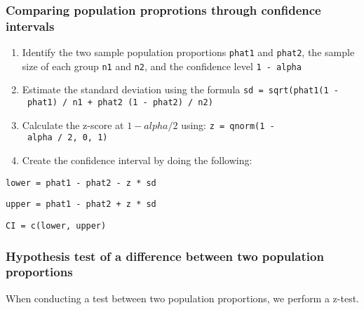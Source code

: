 \hypertarget{comparing-population-proprotions-through-confidence-intervals}{%
\subsubsection{Comparing population proprotions through confidence
intervals}\label{comparing-population-proprotions-through-confidence-intervals}}

\begin{enumerate}
\def\labelenumi{\arabic{enumi}.}
\tightlist
\item
  Identify the two sample population proportions \texttt{phat1} and
  \texttt{phat2}, the sample size of each group \texttt{n1} and
  \texttt{n2}, and the confidence level \texttt{1\ -\ alpha}
\item
  Estimate the standard deviation using the formula
  \texttt{sd\ =\ sqrt(phat1(1\ -\ phat1)\ /\ n1\ +\ phat2\ (1\ -\ phat2)\ /\ n2)}
\item
  Calculate the z-score at \(1 - alpha / 2\) using:
  \texttt{z\ =\ qnorm(1\ -\ alpha\ /\ 2,\ 0,\ 1)}
\item
  Create the confidence interval by doing the following:
\end{enumerate}

\texttt{lower\ =\ phat1\ -\ phat2\ -\ z\ *\ sd}

\texttt{upper\ =\ phat1\ -\ phat2\ +\ z\ *\ sd}

\texttt{CI\ =\ c(lower,\ upper)}

\hypertarget{hypothesis-test-of-a-difference-between-two-population-proportions}{%
\subsubsection{Hypothesis test of a difference between two population
proportions}\label{hypothesis-test-of-a-difference-between-two-population-proportions}}

When conducting a test between two population proportions, we perform a
z-test.

